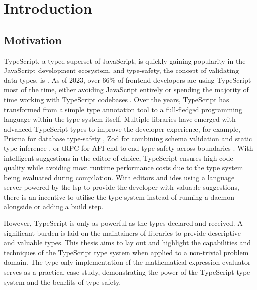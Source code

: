 \chapter{Introduction}

\section{Motivation}

TypeScript, a typed superset of JavaScript, is quickly gaining popularity in the JavaScript development ecosystem, and type-safety, the concept of validating data types, is \cite{jsworldconferenceFredSchottTypesafety2023}. As of 2023, over 66\% of frontend developers are using TypeScript most of the time, either avoiding JavaScript entirely or spending the majority of time working with TypeScript codebases \cite{StateJS2022}. Over the years, TypeScript has transformed from a simple type annotation tool to a full-fledged programming language within the type system itself. Multiple libraries have emerged with advanced TypeScript types to improve the developer experience, for example, Prisma for database type-safety \cite{PrismaPrismaNextgeneration}, Zod for combining schema validation and static type inference \cite{mcdonnellZod2023}, or tRPC for API end-to-end type-safety across boundaries \cite{TRPC2023}. With intelligent suggestions in the editor of choice, TypeScript ensures high code quality while avoiding most runtime performance costs due to the type system being evaluated during compilation. With editors and \acrshort{ide}s using a language server powered by the \acrfull{lsp} to provide the developer with valuable suggestions, there is an incentive to utilise the type system instead of running a daemon alongside or adding a build step.

However, TypeScript is only as powerful as the types declared and received. A significant burden is laid on the maintainers of libraries to provide descriptive and valuable types. This thesis aims to lay out and highlight the capabilities and techniques of the TypeScript type system when applied to a non-trivial problem domain. The type-only implementation of the mathematical expression evaluator serves as a practical case study, demonstrating the power of the TypeScript type system and the benefits of type safety.

